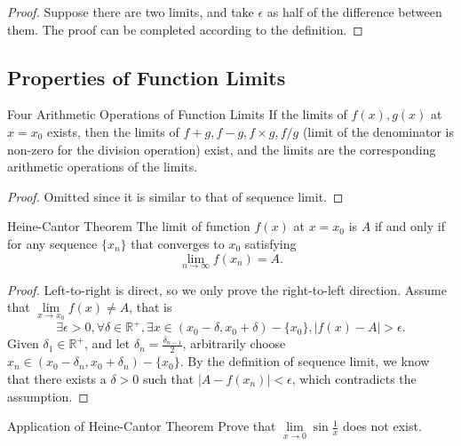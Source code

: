 \begin{proof}
  Suppose there are two limits, and take $\epsilon$ as half of the difference
  between them.
  The proof can be completed according to the definition.
\end{proof}

\subsection{Properties of Function Limits}

\begin{proposition}{Four Arithmetic Operations of Function Limits}{}
  If the limits of $f(x), g(x)$ at $x = x_0$ exists,
  then the limits of $f+g, f-g, f \times g, f/g$
  (limit of the denominator is non-zero for the division operation)
  exist,
  and the limits are the corresponding arithmetic operations of the limits.
\end{proposition}

\begin{proof}
  Omitted since it is similar to that of sequence limit.
\end{proof}

\begin{theorem}{Heine-Cantor Theorem}{}
  The limit of function $f(x)$ at $x = x_0$ is $A$ if and only if
  for any sequence $\{x_n\}$ that converges to $x_0$ satisfying
  \begin{equation}
    \lim \limits _{n \rightarrow \infty} f(x_n) = A.
  \end{equation}
\end{theorem}

\begin{proof}
  Left-to-right is direct, so we only prove the right-to-left direction.
  Assume that $\lim \limits _{x \rightarrow x_0}f(x) \neq A$,
  that is
  \begin{equation}
    \exists \epsilon > 0, \forall \delta \in \mathbb{R}^+,
    \exists x \in (x_0 - \delta, x_0 + \delta) - \{x_0\},
    |f(x) - A| > \epsilon.
  \end{equation}
  Given $\delta_1 \in \mathbb{R}^+$,
  and let $\delta_n = \frac{\delta_{n-1}}{2}$,
  arbitrarily choose $x_n \in (x_0 - \delta_n, x_0 + \delta_n) - \{x_0\}$.
  By the definition of sequence limit, we know that there exists a $\delta > 0$
  such that $|A - f(x_n)| < \epsilon$, which contradicts the assumption.
\end{proof}

\begin{example}{Application of Heine-Cantor Theorem}{}
  Prove that $\lim \limits _{x \rightarrow 0}
  \sin \frac{1}{x}$ does not exist.
\end{example}


